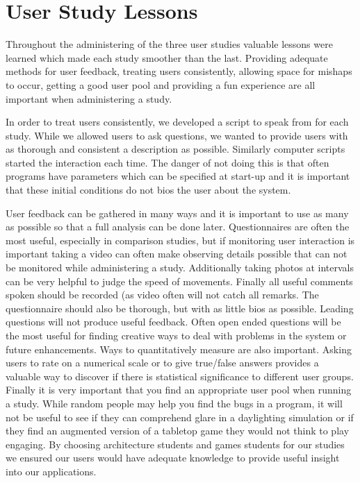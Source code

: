 \section{User Study Lessons}

Throughout the administering of the three user studies valuable lessons were learned which made each study smoother than the last.  Providing adequate methods for user feedback, treating users consistently, allowing space for mishaps to occur, getting a good user pool and providing a fun experience are all important when administering a study.

In order to treat users consistently, we developed a script to speak from for each study.  While we allowed users to ask questions, we wanted to provide users with as thorough and consistent a description as possible.  Similarly computer scripts started the interaction each time.  The danger of not doing this is that often programs have parameters which can be specified at start-up and it is important that these initial conditions do not bios the user about the system.

User feedback can be gathered in many ways and it is important to use as many as possible so that a full analysis can be done later.  Questionnaires are often the most useful, especially in comparison studies, but if monitoring user interaction is important taking a video can often make observing details possible that can not be monitored while administering a study.  Additionally taking photos at intervals can be very helpful to judge the speed of movements.  Finally all useful comments spoken should be recorded (as video often will not catch all remarks.  The questionnaire should also be thorough, but with as little bios as possible.  Leading questions will not produce useful feedback.  Often open ended questions will be the most useful for finding creative ways to deal with problems in the system or future enhancements.  Ways to quantitatively measure are also important.  Asking users to rate on a numerical scale or to give true/false answers provides a valuable way to discover if there is statistical significance to different user groups.  Finally it is very important that you find an appropriate user pool when running a study.  While random people may help you find the bugs in a program, it will not be useful to see if they can comprehend glare in a daylighting simulation or if they find an augmented version of a tabletop game they would not think to play engaging.  By choosing architecture students and games students for our studies we ensured our users would have adequate knowledge to provide useful insight into our applications.
